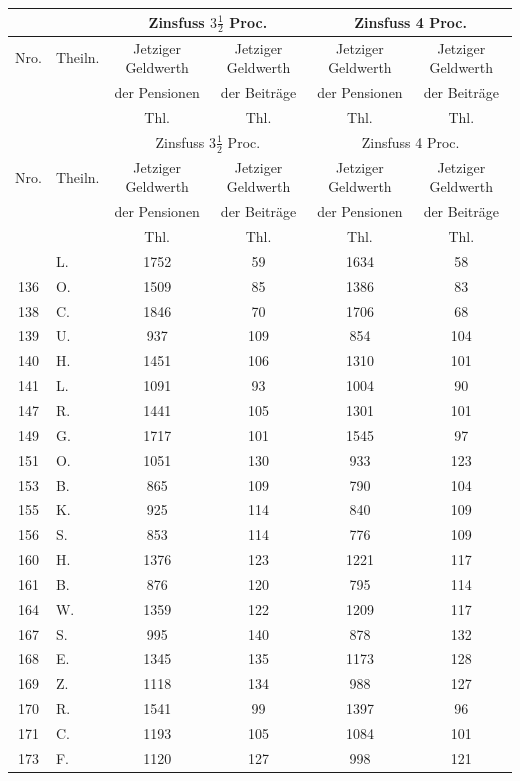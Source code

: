 \documentclass[12pt,a4paper]{article}
\begin{document}
\begin{center}
\begin{longtable}{|c|l|c|c|c|c|}
\hline
\multicolumn{2}{|c|}{} & \multicolumn{2}{c|}{Zinsfuss $3\frac{1}{2}$ Proc.} & \multicolumn{2}{c|}{Zinsfuss 4 Proc.} \\
\hline
Nro. & Theiln. & Jetziger Geldwerth & Jetziger Geldwerth & Jetziger Geldwerth & Jetziger Geldwerth \\
 & & der Pensionen & der Beiträge & der Pensionen & der Beiträge \\
 & & Thl. & Thl. & Thl. & Thl. \\
\hline
\endfirsthead
\hline
\multicolumn{2}{|c|}{} & \multicolumn{2}{c|}{Zinsfuss $3\frac{1}{2}$ Proc.} & \multicolumn{2}{c|}{Zinsfuss 4 Proc.} \\
\hline
Nro. & Theiln. & Jetziger Geldwerth & Jetziger Geldwerth & Jetziger Geldwerth & Jetziger Geldwerth \\
 & & der Pensionen & der Beiträge & der Pensionen & der Beiträge \\
 & & Thl. & Thl. & Thl. & Thl. \\
\hline
\endhead
\hline
\endfoot
135 & L. & 1752 & 59 & 1634 & 58 \\
136 & O. & 1509 & 85 & 1386 & 83 \\
138 & C. & 1846 & 70 & 1706 & 68 \\
139 & U. & 937 & 109 & 854 & 104 \\
140 & H. & 1451 & 106 & 1310 & 101 \\
141 & L. & 1091 & 93 & 1004 & 90 \\
147 & R. & 1441 & 105 & 1301 & 101 \\
149 & G. & 1717 & 101 & 1545 & 97 \\
151 & O. & 1051 & 130 & 933 & 123 \\
153 & B. & 865 & 109 & 790 & 104 \\
155 & K. & 925 & 114 & 840 & 109 \\
156 & S. & 853 & 114 & 776 & 109 \\
160 & H. & 1376 & 123 & 1221 & 117 \\
161 & B. & 876 & 120 & 795 & 114 \\
164 & W. & 1359 & 122 & 1209 & 117 \\
167 & S. & 995 & 140 & 878 & 132 \\
168 & E. & 1345 & 135 & 1173 & 128 \\
169 & Z. & 1118 & 134 & 988 & 127 \\
170 & R. & 1541 & 99 & 1397 & 96 \\
171 & C. & 1193 & 105 & 1084 & 101 \\
173 & F. & 1120 & 127 & 998 & 121 \\
\hline
\end{longtable}
\end{center}
\end{document}

